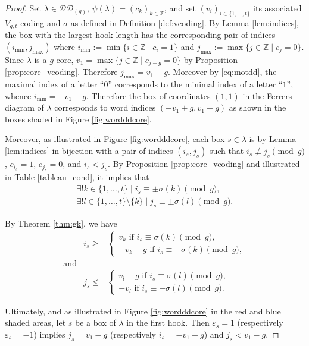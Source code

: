 \documentclass[11pt,letterpaper]{amsart}
\def\bbbz{\mathbb Z}
\def\ccdd{\mathcal {DD}}
\numberwithin{equation}{section}
\numberwithin{df}{section}
\begin{document}
\begin{proof}
Set $\lambda\in \ccdd_{(g)}$, $\psi(\lambda)=\left(c_k\right)_{k\in \bbbz}$, and set $(v_i)_{i\in\lbrace 1,\dots,t\rbrace}$ its associated $V_{g,t}$-coding and $\sigma$ as defined in Definition \ref{def:vcoding}.
By Lemma \ref{lem:indices}, the box with the largest hook length has the corresponding pair of indices $(i_{\min},j_{\max})$ where $i_{\min}:=\min\lbrace i \in \bbbz \mid c_i=1\rbrace$ and $j_{\max}:=\max\lbrace j \in \bbbz \mid c_j=0\rbrace$. Since $\lambda$ is a $g$-core, $v_1=\max\lbrace j \in \bbbz \mid c_{j-g}=0\rbrace$ by Proposition \ref{prop:core_vcoding}. Therefore $j_{\max}=v_1-g$. Moreover by \eqref{eq:motdd}, the maximal index of a letter ``$0$'' corresponds to the minimal index of a letter ``$1$'', whence $i_{\min}=-v_1+g$. Therefore the box of coordinates $(1,1)$ in the Ferrers diagram of $\lambda$ corresponds to word indices $(-v_1+g,v_1-g)$ as shown in the boxes shaded in Figure \ref{fig:wordddcore}. 


Moreover, as illustrated in Figure \ref{fig:wordddcore}, each box $s\in\lambda$ is by Lemma \ref{lem:indices} in bijection with a pair of indices $(i_s,j_s)$ such that $i_s \not\equiv j_s \pmod g$, $c_{i_s}=1$, $c_{j_s}=0$, and $i_s<j_s$. By Proposition \ref{prop:core_vcoding} and illustrated in Table \ref{tableau_cond}, it implies that
\begin{align*}
\exists ! k \in\lbrace 1,\dots,t\rbrace\mid i_s\equiv \pm \sigma(k) \pmod g ,\\
\exists ! l \in\lbrace 1,\dots,t\rbrace \setminus\lbrace k\rbrace \mid j_s\equiv \pm \sigma(l) \pmod g .
\end{align*}

By Theorem \ref{thm:gk}, we have
\begin{equation}\label{eq:indices}
\begin{array}{lll}
&i_s \geq &\begin{cases}
v_k \text{ if } i_s\equiv \sigma(k) \pmod g,\\
-v_k+g \text{ if } i_s\equiv -\sigma(k) \pmod g,
\end{cases} 
\\
\text{and}& &
\\
&j_s \leq &\begin{cases}
v_l-g \text{ if } i_s\equiv \sigma(l) \pmod g,\\
-v_l \text{ if } i_s\equiv -\sigma(l) \pmod g.
\end{cases}
\end{array}
\end{equation}

Ultimately, and as illustrated in Figure \ref{fig:wordddcore} in the red and blue shaded areas, let $s$ be a box of $\lambda$ in the first hook. Then $\varepsilon_s=1$ (respectively $\varepsilon_s=-1$) implies $j_s=v_1-g$ (respectively $i_s=-v_1+g$) and $j_s<v_1-g$. 
\end{proof}
\end{document}
